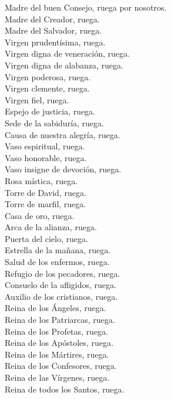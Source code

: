 \documentclass[10pt,a4paper,oneside]{book}
\begin{document}
\begin{minipage}[t]{0.475\textwidth}
    Madre del buen Consejo, ruega por nosotros.\\
    Madre del Creador, ruega.\\
    Madre del Salvador, ruega.\\
    Virgen prudentísima, ruega.\\
    Virgen digna de veneración, ruega.\\
    Virgen digna de alabanza, ruega.\\
    Virgen poderosa, ruega.\\
    Virgen clemente, ruega.\\
    Virgen fiel, ruega.\\
    Espejo de justicia, ruega.\\
    Sede de la sabiduría, ruega.\\
    Causa de nuestra alegría, ruega.\\
    Vaso espiritual, ruega.\\
    Vaso honorable, ruega.\\
    Vaso insigne de devoción, ruega.\\
    Rosa mística, ruega.\\
    Torre de David, ruega.\\
    Torre de marfil, ruega.\\
    Casa de oro, ruega.\\
    Arca de la alianza, ruega.\\
    Puerta del cielo, ruega.\\
    Estrella de la mañana, ruega.\\
    Salud de los enfermos, ruega.\\
    Refugio de los pecadores, ruega.\\
    Consuelo de la afligidos, ruega.\\
    Auxilio de los cristianos, ruega.\\
    Reina de los Ángeles, ruega.\\
    Reina de los Patriarcas, ruega.\\
    Reina de los Profetas, ruega.\\
    Reina de los Apóstoles, ruega.\\
    Reina de los Mártires, ruega.\\
    Reina de los Confesores, ruega.\\
    Reina de las Vírgenes, ruega.\\
    Reina de todos los Santos, ruega.\\

\end{minipage}
\end{document}
